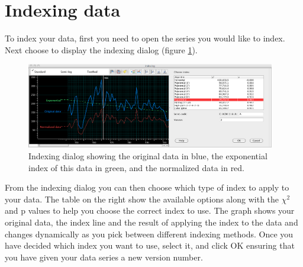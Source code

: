 \section{Indexing data}
To index your data, first you need to open the series you would like to index.  Next choose  to display the indexing dialog (figure \ref{fig:index}).

\begin{figure}[hbtp]
  \centering
    \includegraphics[width=0.97\textwidth]{Images/index.png}
    \caption{Indexing dialog showing the original data in blue, the exponential index of this data in green, and the normalized data in red. }
    \label{fig:index}
\end{figure}

From the indexing dialog you can then choose which type of index to apply to your data.  The table on the right show the available options along with the $\chi^2$ and p values to help you choose the correct index to use. The graph shows your original data, the index line and the result of applying the index to the data and changes dynamically as you pick between different indexing methods. Once you have decided which index you want to use, select it, and click OK ensuring that you have given your data series a new version number.

